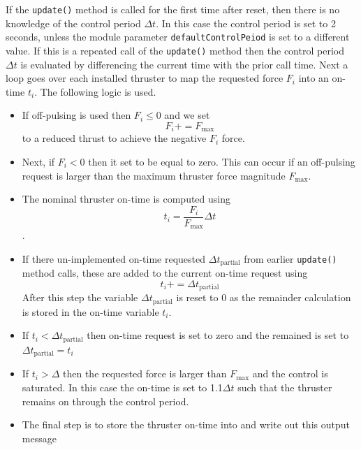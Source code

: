 If the {\tt update()} method is called for the first time after reset, then there is no knowledge of the control period $\Delta t$.  In this case the control period is set to 2 seconds, unless the module parameter \texttt{defaultControlPeiod} is set to a different value. If this is a repeated call of the {\tt update()} method then the control period $\Delta t$ is evaluated by differencing the current time with the prior call time.  Next a loop goes over each installed thruster to map the requested force $F_{i}$ into an on-time $t_{i}$.  The following logic is used.
\begin{itemize}
	\item If off-pulsing is used then $F_{i}\le 0$ and we set $$F_{i} += F_{\text{max}}$$ to a reduced thrust to achieve the negative $F_{i}$ force.
	\item Next, if $F_{i} < 0$ then it set to be equal to zero.  This can occur if an off-pulsing request is larger than the maximum thruster force magnitude $F_{\text{max}}$.
	\item The nominal thruster on-time is computed using $$t_{i}  = \dfrac{F_{i}}{F_{\text{max}}} \Delta t$$.
	\item If there un-implemented on-time requested $\Delta t_{\text{partial}}$ from earlier  {\tt update()} method calls, these are added to the current on-time request using $$t_{i} += \Delta t_{\text{partial}}$$ After this step the variable $\Delta t_{\text{partial}}$ is reset to 0 as the remainder calculation is stored in the on-time variable $t_{i}$.
	\item If $t_{i} < \Delta t_{\text{partial}}$ then on-time request is set to zero and the remained is set to $\Delta t_{\text{partial}} = t_{i}$
	\item If $t_{i} > \Delta $ then the requested force is larger than $F_{\text{max}}$ and the control is saturated.  In this case the on-time is set to 1.1$\Delta t$ such that the thruster remains on through the control period.
	\item The final step is to store the thruster on-time into  and write out this output message
\end{itemize}
